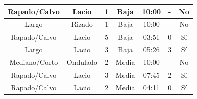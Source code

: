 \begin{table}[!htb]
{\begin{tabular}{|c|c|c|c|c|c|c|}
Rapado/Calvo                                                  & Lacio                                                    & 1                                                               & Baja        & 10:00                                                & -                                                             & No                                                           \\ \hline
Largo                                                         & Rizado                                                   & 1                                                               & Baja        & 10:00                                                & -                                                             & No                                                           \\ \hline
Rapado/Calvo                                                  & Lacio                                                    & 5                                                               & Baja        & 03:51                                                & 0                                                             & Sí                                                           \\ \hline
Largo                                                         & Lacio                                                    & 3                                                               & Baja        & 05:26                                                & 3                                                             & Sí                                                           \\ \hline
Mediano/Corto                                                 & Ondulado                                                 & 2                                                               & Media       & 10:00                                                & -                                                             & No                                                           \\ \hline
Rapado/Calvo                                                  & Lacio                                                    & 3                                                               & Media       & 07:45                                                & 2                                                             & Sí                                                           \\ \hline
Rapado/Calvo                                                  & Lacio                                                    & 2                                                               & Media       & 04:11                                                & 0                                                             & Sí                                                           \\ \hline

\end{tabular}}
\end{table}
